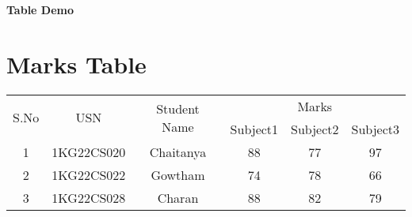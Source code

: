 \documentclass[10pt,a4paper]{article}
\begin{document}
    \begin{center}
   	 \begin{Large}
   		 \textbf{Table Demo}
   	 \end{Large}
    \end{center}
    \section*{Marks Table}
    \begin{tabular}{|c|c|c|c|c|c|} %
   	 \hline %
   	 
   	 \multirow{2}{*}{S.No} & \multirow{2}{*}{USN} & \multirow{2}{*}{Student Name} & \multicolumn{3}{c|}{Marks} \\ %
   	 
   	 \cline{4-6}
   	 & & & Subject1 & Subject2 & Subject3 \\
   	 \hline
   	 1 & 1KG22CS020 & Chaitanya & 88 & 77 & 97 \\
   	 \hline
   	 2 & 1KG22CS022 & Gowtham & 74 & 78 & 66 \\
   	 \hline
   	 3 & 1KG22CS028 & Charan & 88 & 82 & 79 \\
   	 \hline
    \end{tabular}
\end{document}
